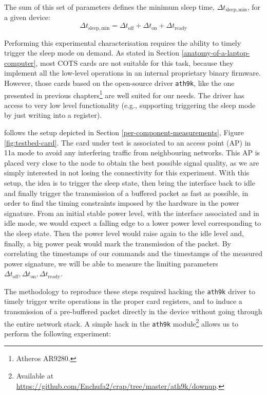 \documentclass[twoside,nohyper]{tufte-book}
\begin{document}
The sum of this set of parameters defines the minimum sleep time, \(\Delta t_\mathrm{sleep,min}\), for a given device:
%
\begin{equation}
 \Delta t_\mathrm{sleep,min} = \Delta t_\mathrm{off} + \Delta t_\mathrm{on} + \Delta t_\mathrm{ready}
 \label{eq:sleepmin}
\end{equation}
%


Performing this experimental characterisation requires the ability to timely trigger the sleep mode on demand. As stated in Section \ref{anatomy-of-a-laptop-computer}, most COTS cards are not suitable for this task, because they implement all the low-level operations in an internal proprietary binary firmware. However, those cards based on the open-source driver \texttt{ath9k}, like the one presented in previous chapters\footnote{Atheros AR9280.} are well suited for our needs. The driver has access to very low level functionality (e.g., supporting triggering the sleep mode by just writing into a register).

 follows the setup depicted in Section \ref{per-component-measurements}, Figure \ref{fig:testbed-card}. The card under test is associated to an access point (AP) in 11a mode to avoid any interfering traffic from neighbouring networks. This AP is placed very close to the node to obtain the best possible signal quality, as we are simply interested in not losing the connectivity for this experiment. With this setup, the idea is to trigger the sleep state, then bring the interface back to idle and finally trigger the transmission of a buffered packet as fast as possible, in order to find the timing constraints imposed by the hardware in the power signature. From an initial stable power level, with the interface associated and in idle mode, we would expect a falling edge to a lower power level corresponding to the sleep state. Then the power level would raise again to the idle level and, finally, a big power peak would mark the transmission of the packet. By correlating the timestamps of our commands and the timestamps of the measured power signature, we will be able to measure the limiting parameters \(\Delta t_\mathrm{off}, \Delta t_\mathrm{on}, \Delta t_\mathrm{ready}\).

The methodology to reproduce these steps required hacking the \texttt{ath9k} driver to timely trigger write operations in the proper card registers, and to induce a transmission of a pre-buffered packet directly in the device without going through the entire network stack. A simple hack in the \texttt{ath9k} module\footnote{Available at \url{https://github.com/Enchufa2/crap/tree/master/ath9k/downup}.} allows us to perform the following experiment:
\end{document}
